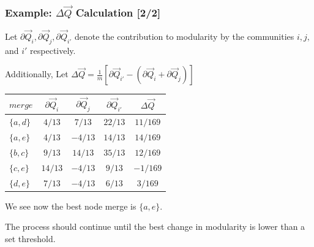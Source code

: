 \documentclass{beamer}
\newcommand{\ds}{\displaystyle}
\begin{document}
\begin{frame}

    \frametitle{Example: $ \Delta \vec{Q} $ Calculation [2/2]}

    Let $ \partial \vec{Q}_{i}, \partial \vec{Q}_{j}, \partial \vec{Q}_{i'} $ denote the contribution to modularity by the communities $ i, j, $ and $ i' $ respectively.\pause

    \vspace{2.5mm}
    Additionally, Let $ \ds \Delta \vec{Q} = \frac{1}{m} \left[ \partial \vec{Q}_{i'} - (\partial \vec{Q}_{i} + \partial \vec{Q}_{j}) \right] $\pause

    \vspace{2.5mm}
    \begin{center}
        \begin{tabular}{l | c c c c}
            $ merge    $ & $ \partial \vec{Q}_{i} $ & $ \partial \vec{Q}_{j} $ & $ \partial \vec{Q}_{i'} $ & $ \Delta \vec{Q} $ \\
            \hline
            $ \{a, d\} $ & $ 4/13  $ & $  7/13  $ & $ 22/13 $ & $ 11/169 $ \\
            \rowcolor{ummaize}
            $ \{a, e\} $ & $ 4/13  $ & $ -4/13  $ & $ 14/13 $ & $ 14/169 $ \\
            $ \{b, c\} $ & $  9/13 $ & $  14/13 $ & $ 35/13 $ & $ 12/169 $ \\
            $ \{c, e\} $ & $ 14/13 $ & $ -4/13  $ & $  9/13 $ & $ -1/169 $ \\
            $ \{d, e\} $ & $  7/13 $ & $ -4/13  $ & $  6/13 $ & $  3/169 $ \\
        \end{tabular}
    \end{center}\pause

    \vspace{2.5mm}
    We see now the best node merge is $ \{a, e\} $.\pause

    \vspace{2.5mm}
    The process should continue until the best change in modularity is lower than a set threshold.

\end{frame}
\end{document}
